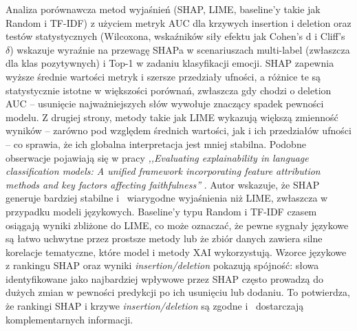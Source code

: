 \documentclass[wmii, inf, mgr]{uwmthesis}
\begin{document}
Analiza porównawcza metod wyjaśnień (SHAP, LIME, baseline’y takie jak Random i TF-IDF) z użyciem metryk AUC dla krzywych insertion i deletion oraz testów statystycznych (Wilcoxona, wskaźników siły efektu jak Cohen’s d i Cliff’s $\delta$) wskazuje wyraźnie na przewagę SHAPa w scenariuszach multi-label (zwłaszcza dla klas pozytywnych) i Top-1 w zadaniu klasyfikacji emocji. SHAP zapewnia wyższe średnie wartości metryk i szersze przedziały ufności, a różnice te są statystycznie istotne w większości porównań, zwłaszcza gdy chodzi o deletion AUC -- usunięcie najważniejszych słów wywołuje znaczący spadek pewności modelu. Z drugiej strony, metody takie jak LIME wykazują większą zmienność wyników -- zarówno pod względem średnich wartości, jak i ich przedziałów ufności -- co sprawia, że ich globalna interpretacja jest mniej stabilna. Podobne obserwacje pojawiają się w pracy \textit{,,Evaluating explainability in language classification models: A unified framework incorporating feature attribution methods and key factors affecting faithfulness''} \cite{dehdarirad2025}. Autor wskazuje, że SHAP generuje bardziej stabilne i~ wiarygodne wyjaśnienia niż LIME, zwłaszcza w przypadku modeli językowych. Baseline’y typu Random i TF-IDF czasem osiągają wyniki zbliżone do LIME, co może oznaczać, że pewne sygnały językowe są łatwo uchwytne przez prostsze metody lub że zbiór danych zawiera silne korelacje tematyczne, które model i metody XAI wykorzystują. Wzorce językowe z rankingu SHAP oraz wyniki \textit{insertion/deletion} pokazują spójność: słowa identyfikowane jako najbardziej wpływowe przez SHAP często prowadzą do dużych zmian w pewności predykcji po ich usunięciu lub dodaniu. To potwierdza, że rankingi SHAP i krzywe \textit{insertion/deletion} są zgodne i~ dostarczają komplementarnych informacji.
\end{document}
